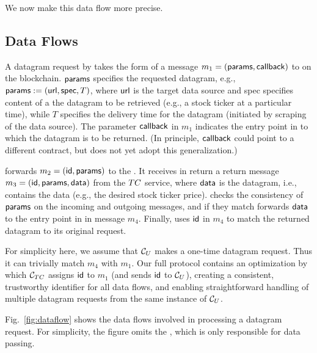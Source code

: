 \noindent We now make this data flow more precise. 

\subsection{Data Flows}

A datagram request by \reqcont takes the form of a message $m_1 = ({\sf params}, {\sf callback})$ to \tcont on the blockchain. ${\sf params}$ specifies the requested datagram, e.g., ${\sf params} := ({{\sf url}}, {\sf spec}, T)$, where ${{\sf url}}$ is the target data source and {\sf spec} specifies content of a the datagram to be retrieved (e.g., a stock ticker at a particular time), while $T$ specifies the delivery time for the datagram (initiated by scraping of the data source). The parameter ${\sf callback}$ in $m_1$ indicates the entry point in \reqcont to which the datagram is to be returned. (In principle, ${\sf callback}$ could point to a different contract, but \tc does not yet adopt this generalization.) 

\tcont forwards $m_2 = ({\sf id}, {\sf params})$ to the \encname. It receives in return a return message $m_3 = ({\sf id}, {\sf params}, {\sf data})$ from the $TC$ service, where ${\sf data}$ is the datagram, i.e., contains the data (e.g., the desired stock ticker price). \tcont checks the consistency of ${\sf params}$ on the incoming and outgoing messages, and if they match forwards ${\sf data}$ to the entry point \dgcallback in \reqcont in message $m_4$. Finally, \reqcont uses ${\sf id}$ in $m_4$ to match the returned datagram to its original request.

For simplicity here, we assume that ${\cal C}_U$ makes a one-time datagram request. Thus it can trivially match $m_4$ with $m_1$. Our full protocol contains an optimization by which ${\cal C}_{TC}$ assigns ${\sf id}$ to $m_1$ (and sends ${\sf id}$ to ${\cal C}_U$), creating a consistent, trustworthy identifier for all data flows, and enabling straightforward handling of multiple datagram requests from the same instance of ${\cal C}_U$.

Fig.~\ref{fig:dataflow} shows the data flows involved in processing a datagram request. For simplicity, the figure omits the \medname, which is only responsible for data passing.


